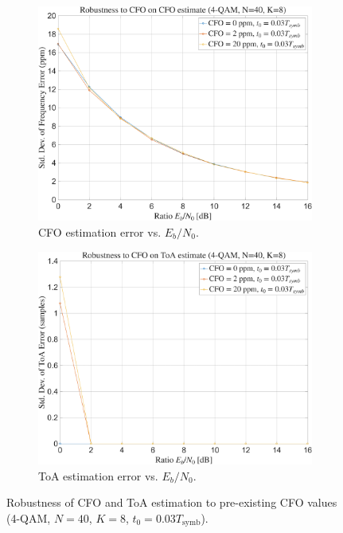 \documentclass[11pt]{article}
\begin{document}
	\begin{figure}[H]
		\centering
		\begin{subfigure}[b]{0.4\textwidth} 
			\centering
			\includegraphics[width=\linewidth]{Images/robust-cfo.png}
			\caption{CFO estimation error vs. $E_b/N_0$.} 
			\label{fig:robust-cfo-sub}
		\end{subfigure}
		\hfill
		\begin{subfigure}[b]{0.4\textwidth} 
			\centering
			\includegraphics[width=\linewidth]{Images/robust-toa.png}
			\caption{ToA estimation error vs. $E_b/N_0$.} 
			\label{fig:robust-toa-sub}
		\end{subfigure}
		\caption{Robustness of CFO and ToA estimation to pre-existing CFO values (4-QAM, $N=40$, $K=8$, $t_0 = 0.03T_{\text{symb}}$).}
		\label{fig:robustness-combined}
	\end{figure}
	
\end{document}
